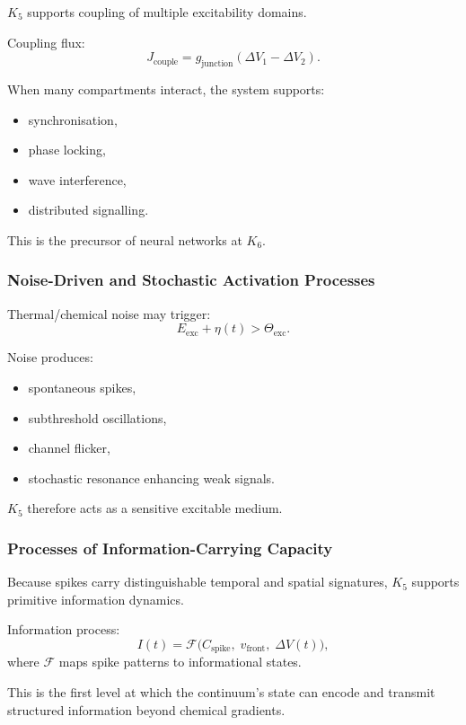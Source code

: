 $K_5$ supports coupling of multiple excitability domains.

Coupling flux:
\[
J_{\text{couple}} = g_{\text{junction}}(\Delta V_1 - \Delta V_2).
\]

When many compartments interact, the system supports:
\begin{itemize}
    \item synchronisation,
    \item phase locking,
    \item wave interference,
    \item distributed signalling.
\end{itemize}

This is the precursor of neural networks at $K_6$.

\subsubsection{Noise-Driven and Stochastic Activation Processes}

Thermal/chemical noise may trigger:
\[
E_{\text{exc}} + \eta(t) > \Theta_{\text{exc}}.
\]

Noise produces:
\begin{itemize}
    \item spontaneous spikes,
    \item subthreshold oscillations,
    \item channel flicker,
    \item stochastic resonance enhancing weak signals.
\end{itemize}

$K_5$ therefore acts as a sensitive excitable medium.

\subsubsection{Processes of Information-Carrying Capacity}

Because spikes carry distinguishable temporal and spatial signatures,
$K_5$ supports primitive information dynamics.

Information process:
\[
I(t) = \mathcal{F}\big(C_{\text{spike}},\; v_{\text{front}},\; \Delta V(t)\big),
\]
where $\mathcal{F}$ maps spike patterns to informational states.

This is the first level at which the continuum’s state can encode
and transmit structured information beyond chemical gradients.

